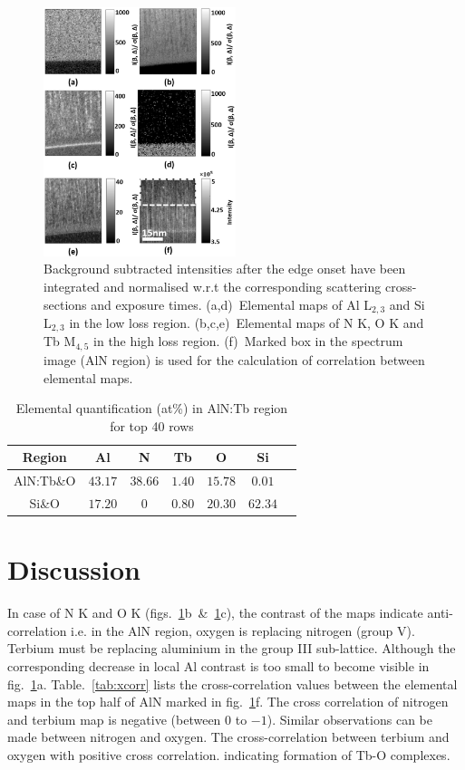 \documentclass[%
 aip,
rsi,%
 amsmath,amssymb,
 reprint,%
]{revtex4-1}
\begin{document}
\begin{figure}[!ht]
	\centering
    \includegraphics[width=0.5\textwidth]{combined_maps}
    \caption{Background subtracted intensities after the edge onset have been integrated and normalised w.r.t the corresponding scattering cross-sections and exposure times. (a,d)~Elemental maps of Al L$_{2,3}$ and Si L$_{2,3}$ in the low loss region. (b,c,e)~Elemental maps of N K, O K and Tb M$_{4,5}$ in the high loss region. (f)~Marked box in the spectrum image (AlN region) is used for the calculation of correlation between elemental maps.}
    \label{fig:combined_maps}
\end{figure}

\begin{table}[!ht]
	\caption{Elemental quantification (at\%) in AlN:Tb region for top 40 rows}
    \label{tab:atper}
    \begin{ruledtabular}
    	\begin{tabular}{ccccccc}
        	Region&Al&N&Tb&O&Si	\\ \hline
            AlN:Tb\&O&$43.17$&$38.66$&$1.40$&$15.78$&$0.01$ \\
            Si\&O &$17.20$&$0$&$0.80$&$20.30$&$62.34$
    	\end{tabular}
    \end{ruledtabular}
\end{table}

\section{Discussion} %
\label{sec:discussion}
In case of N K and O K (figs.~\ref{fig:combined_maps}b~\&~\ref{fig:combined_maps}c), the contrast of the maps indicate anti-correlation i.e. in the AlN region, oxygen is replacing nitrogen (group V). Terbium must be replacing aluminium in the group III sub-lattice. Although the corresponding decrease in local Al contrast is too small to become visible in fig.~\ref{fig:combined_maps}a. Table.~\ref{tab:xcorr} lists the cross-correlation values between the elemental maps in the top half of AlN marked in fig.~\ref{fig:combined_maps}f. The cross correlation of nitrogen and terbium map is negative (between $0$ to $-1$). Similar observations can be made between nitrogen and oxygen. The cross-correlation between terbium and oxygen with positive cross correlation.  indicating formation of Tb-O complexes.
\end{document}
